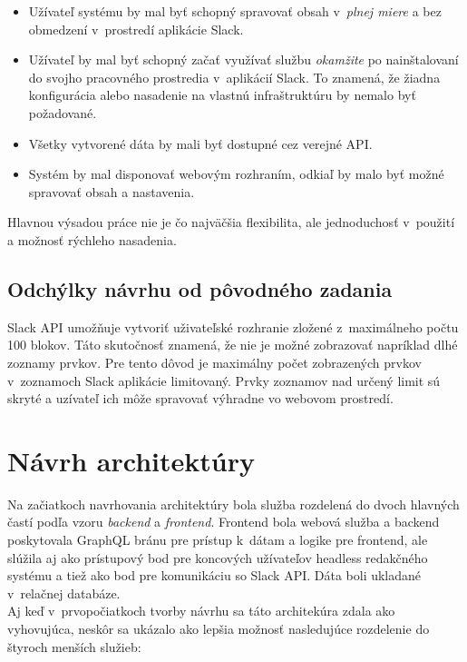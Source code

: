 \begin{itemize}
	\item Užívateľ systému by mal byť schopný spravovať obsah v~\emph{plnej miere} a bez obmedzení v~prostredí aplikácie Slack.
	\item Užívateľ by mal byť schopný začať využívať službu \emph{okamžite} po nainštalovaní do svojho pracovného prostredia v~aplikácií Slack. To znamená, že žiadna konfigurácia alebo nasadenie na vlastnú infraštruktúru by nemalo byť požadované.
	\item Všetky vytvorené dáta by mali byť dostupné cez verejné API.
	\item Systém by mal disponovať webovým rozhraním, odkiaľ by malo byť možné spravovať obsah a nastavenia.
\end{itemize}

\noindent Hlavnou výsadou práce nie je čo najväčšia flexibilita, ale jednoduchosť v~použití a možnosť rýchleho nasadenia. 

\subsection{Odchýlky návrhu od pôvodného zadania}
Slack API umožňuje vytvoriť uživateľské rozhranie zložené z~maximálneho počtu 100 blokov. Táto skutočnosť znamená, že nie je možné zobrazovať napríklad dlhé zoznamy prvkov. Pre tento dôvod je maximálny počet zobrazených prvkov v~zoznamoch Slack aplikácie limitovaný. Prvky zoznamov nad určený limit sú skryté a uzívateľ ich môže spravovať výhradne vo webovom prostredí. 

\section{Návrh architektúry}
Na začiatkoch navrhovania architektúry bola služba rozdelená do dvoch hlavných častí podľa vzoru \emph{backend} a \emph{frontend}. Frontend bola webová služba a backend poskytovala GraphQL bránu pre prístup k~dátam a logike pre frontend, ale slúžila aj ako prístupový bod pre koncových užívateľov headless redakčného systému a tiež ako bod pre komunikáciu so Slack API. Dáta boli ukladané v~relačnej databáze. \\

\noindent Aj keď v~prvopočiatkoch tvorby návrhu sa táto architekúra zdala ako vyhovujúca, neskôr sa ukázalo ako lepšia možnosť nasledujúce rozdelenie do štyroch menších služieb:

